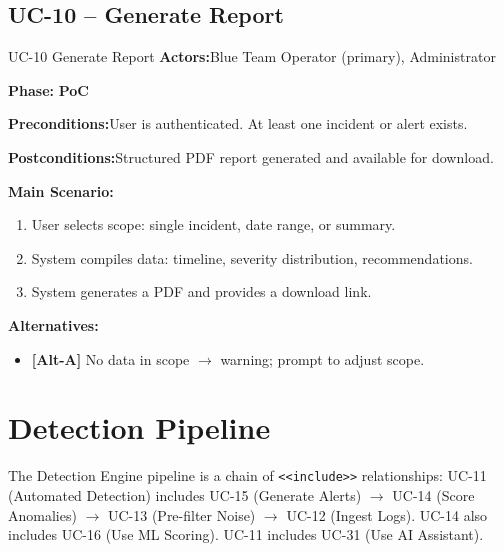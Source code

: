 \documentclass[12pt,a4paper]{report}
\newcommand{\ucfield}[2]{%
    \noindent\textbf{\color{helixpurplemid}#1:}\quad #2\par\medskip
}
\newcommand{\ucphase}[1]{%
    \noindent\textbf{\color{helixpurplemid}Phase:}\quad%
    \ifstrequal{#1}{PoC}{\textcolor{helixteal}{\textbf{PoC}}}{\textcolor{helixamber}{\textbf{Future MVP}}}%
    \par\medskip
}
\begin{document}
\section{UC-10 -- Generate Report}
\begin{ucbox}{UC-10 \quad Generate Report}
    \ucfield{Actors}{Blue Team Operator (primary), Administrator}
    \ucphase{PoC}
    \ucfield{Preconditions}{User is authenticated. At least one incident or alert exists.}
    \ucfield{Postconditions}{Structured PDF report generated and available for download.}
    \textbf{\color{helixpurplemid}Main Scenario:}
    \begin{enumerate}
        \item User selects scope: single incident, date range, or summary.
        \item System compiles data: timeline, severity distribution, recommendations.
        \item System generates a PDF and provides a download link.
    \end{enumerate}
    \textbf{\color{helixpurplemid}Alternatives:}
    \begin{itemize}
        \item \textbf{[Alt-A]} No data in scope $\rightarrow$ warning; prompt to adjust scope.
    \end{itemize}
\end{ucbox}

\chapter{Detection Pipeline}

The Detection Engine pipeline is a chain of \texttt{<<include>>} relationships:
UC-11 (Automated Detection) includes UC-15 (Generate Alerts) $\rightarrow$ UC-14 (Score Anomalies) $\rightarrow$ UC-13 (Pre-filter Noise) $\rightarrow$ UC-12 (Ingest Logs).
UC-14 also includes UC-16 (Use ML Scoring). UC-11 includes UC-31 (Use AI Assistant).
\end{document}
